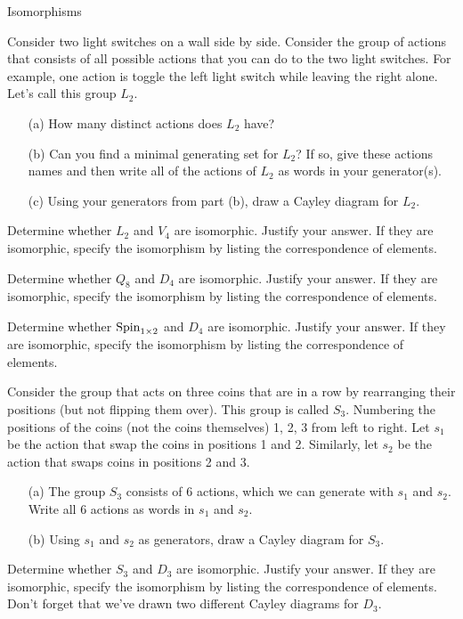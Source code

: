 \begin{section}{Isomorphisms}
\begin{exercise}
Consider two light switches on a wall side by side.  Consider the group of actions that consists of all possible actions that you can do to the two light switches.  For example, one action is toggle the left light switch while leaving the right alone.  Let's call this group $L_2$.
\begin{enumerate}
\item[(a)] How many distinct actions does $L_2$ have?
\item[(b)] Can you find a minimal generating set for $L_2$?  If so, give these actions names and then write all of the actions of $L_2$ as words in your generator(s).
\item[(c)] Using your generators from part (b), draw a Cayley diagram for $L_2$.
\end{enumerate}
\end{exercise}

\begin{problem}
Determine whether $L_2$ and $V_4$ are isomorphic.  Justify your answer.  If they are isomorphic, specify the isomorphism by listing the correspondence of elements.
\end{problem}

\begin{problem}
Determine whether $Q_8$ and $D_4$ are isomorphic.  Justify your answer.  If they are isomorphic, specify the isomorphism by listing the correspondence of elements.
\end{problem}

\begin{problem}
Determine whether $\operatorname{Spin}_{1\times 2}$ and $D_4$ are isomorphic.  Justify your answer.  If they are isomorphic, specify the isomorphism by listing the correspondence of elements.
\end{problem}

\begin{exercise}
Consider the group that acts on three coins that are in a row by rearranging their positions (but not flipping them over).  This group is called $S_3$.  Numbering the positions of the coins (not the coins themselves) 1, 2, 3 from left to right.  Let $s_1$ be the action that swap the coins in positions 1 and 2.  Similarly, let $s_2$ be the action that swaps coins in positions 2 and 3.
\begin{enumerate}
\item[(a)] The group $S_3$ consists of 6 actions, which we can generate with $s_1$ and $s_2$.  Write all 6 actions as words in $s_1$ and $s_2$.
\item[(b)] Using $s_1$ and $s_2$ as generators, draw a Cayley diagram for $S_3$.
\end{enumerate}
\end{exercise}

\begin{problem}
Determine whether $S_3$ and $D_3$ are isomorphic.  Justify your answer.  If they are isomorphic, specify the isomorphism by listing the correspondence of elements.  Don't forget that we've drawn two different Cayley diagrams for $D_3$.
\end{problem}

\end{section}